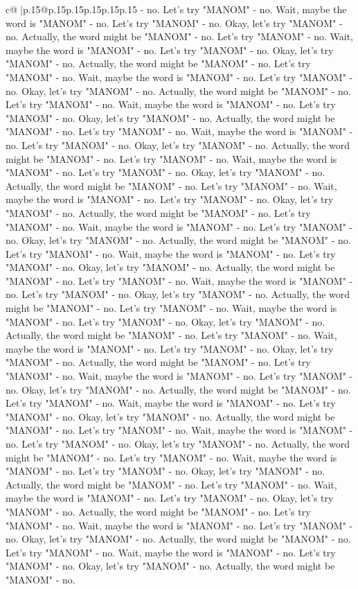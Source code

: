 \documentclass{article}
\begin{document}
{\begin{supertabular}{c@{$\;$}|p{.15\linewidth}@{}p{.15\linewidth}p{.15\linewidth}p{.15\linewidth}p{.15\linewidth}p{.15\linewidth}}
{{{{-} no. Let's try "MANOM" {-} no. Wait, maybe the word is "MANOM" {-} no. Let's try "MANOM" {-} no. Okay, let's try "MANOM" {-} no. Actually, the word might be "MANOM" {-} no. Let's try "MANOM" {-} no. Wait, maybe the word is "MANOM" {-} no. Let's try "MANOM" {-} no. Okay, let's try "MANOM" {-} no. Actually, the word might be "MANOM" {-} no. Let's try "MANOM" {-} no. Wait, maybe the word is "MANOM" {-} no. Let's try "MANOM" {-} no. Okay, let's try "MANOM" {-} no. Actually, the word might be "MANOM" {-} no. Let's try "MANOM" {-} no. Wait, maybe the word is "MANOM" {-} no. Let's try "MANOM" {-} no. Okay, let's try "MANOM" {-} no. Actually, the word might be "MANOM" {-} no. Let's try "MANOM" {-} no. Wait, maybe the word is "MANOM" {-} no. Let's try "MANOM" {-} no. Okay, let's try "MANOM" {-} no. Actually, the word might be "MANOM" {-} no. Let's try "MANOM" {-} no. Wait, maybe the word is "MANOM" {-} no. Let's try "MANOM" {-} no. Okay, let's try "MANOM" {-} no. Actually, the word might be "MANOM" {-} no. Let's try "MANOM" {-} no. Wait, maybe the word is "MANOM" {-} no. Let's try "MANOM" {-} no. Okay, let's try "MANOM" {-} no. Actually, the word might be "MANOM" {-} no. Let's try "MANOM" {-} no. Wait, maybe the word is "MANOM" {-} no. Let's try "MANOM" {-} no. Okay, let's try "MANOM" {-} no. Actually, the word might be "MANOM" {-} no. Let's try "MANOM" {-} no. Wait, maybe the word is "MANOM" {-} no. Let's try "MANOM" {-} no. Okay, let's try "MANOM" {-} no. Actually, the word might be "MANOM" {-} no. Let's try "MANOM" {-} no. Wait, maybe the word is "MANOM" {-} no. Let's try "MANOM" {-} no. Okay, let's try "MANOM" {-} no. Actually, the word might be "MANOM" {-} no. Let's try "MANOM" {-} no. Wait, maybe the word is "MANOM" {-} no. Let's try "MANOM" {-} no. Okay, let's try "MANOM" {-} no. Actually, the word might be "MANOM" {-} no. Let's try "MANOM" {-} no. Wait, maybe the word is "MANOM" {-} no. Let's try "MANOM" {-} no. Okay, let's try "MANOM" {-} no. Actually, the word might be "MANOM" {-} no. Let's try "MANOM" {-} no. Wait, maybe the word is "MANOM" {-} no. Let's try "MANOM" {-} no. Okay, let's try "MANOM" {-} no. Actually, the word might be "MANOM" {-} no. Let's try "MANOM" {-} no. Wait, maybe the word is "MANOM" {-} no. Let's try "MANOM" {-} no. Okay, let's try "MANOM" {-} no. Actually, the word might be "MANOM" {-} no. Let's try "MANOM" {-} no. Wait, maybe the word is "MANOM" {-} no. Let's try "MANOM" {-} no. Okay, let's try "MANOM" {-} no. Actually, the word might be "MANOM" {-} no. Let's try "MANOM" {-} no. Wait, maybe the word is "MANOM" {-} no. Let's try "MANOM" {-} no. Okay, let's try "MANOM" {-} no. Actually, the word might be "MANOM" {-} no. Let's try "MANOM" {-} no. Wait, maybe the word is "MANOM" {-} no. Let's try "MANOM" {-} no. Okay, let's try "MANOM" {-} no. Actually, the word might be "MANOM" {-} no. Let's try "MANOM" {-} no. Wait, maybe the word is "MANOM" {-} no. Let's try "MANOM" {-} no. Okay, let's try "MANOM" {-} no. Actually, the word might be "MANOM" {-} no. Let's try "MANOM" {-} no. Wait, maybe the word is "MANOM" {-} no. Let's try "MANOM" {-} no. Okay, let's try "MANOM" {-} no. Actually, the word might be "MANOM" {-} no. }}}
\end{supertabular}}
\end{document}
